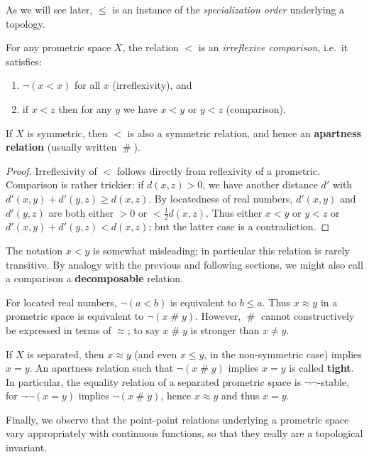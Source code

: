\documentclass{article}
\def\apart{\mathrel{\#}}
\begin{document}
As we will see later, $\le$ is an instance of the \emph{specialization order} underlying a topology.

\begin{thm}
  For any prometric space $X$, the relation $<$ is an \emph{irreflexive comparison}, i.e.\ it satisfies:
  \begin{enumerate}
  \item $\neg(x<x)$ for all $x$ (irreflexivity), and
  \item if $x<z$ then for any $y$ we have $x<y$ or $y<z$ (comparison).
  \end{enumerate}
  If $X$ is symmetric, then $<$ is also a symmetric relation, and hence an \textbf{apartness relation} (usually written $\apart$).
\end{thm}
\begin{proof}
  Irreflexivity of $<$ follows directly from reflexivity of a prometric.
  Comparison is rather trickier: if $d(x,z)>0$, we have another distance $d'$ with $d'(x,y)+d'(y,z)\ge d(x,z)$.
  By locatedness of real numbers, $d'(x,y)$ and $d'(y,z)$ are both either $>0$ or $<\frac12 d(x,z)$.
  Thus either $x<y$ or $y<z$ or $d'(x,y)+d'(y,z) < d(x,z)$; but the latter case is a contradiction.
\end{proof}

The notation $x<y$ is somewhat misleading; in particular this relation is rarely transitive.
By analogy with the previous and following sections, we might also call a comparison a 
\textbf{decomposable} relation.

For located real numbers, $\neg(a<b)$ is equivalent to $b\le a$.
Thus $x\approx y$ in a prometric space is equivalent to $\neg(x\apart y)$.
However, $\apart$ cannot constructively be expressed in terms of $\approx$; to say $x\apart y$ is stronger than $x\neq y$.

If $X$ is separated, then $x\approx y$ (and even $x\le y$, in the non-symmetric case) implies $x=y$.
An apartness relation such that $\neg(x\apart y)$ implies $x=y$ is called \textbf{tight}.
In particular, the equality relation of a separated prometric space is $\neg\neg$-stable, for $\neg\neg(x=y)$ implies $\neg(x\apart y)$, hence $x\approx y$ and thus $x=y$.

Finally, we observe that the point-point relations underlying a prometric space vary appropriately with continuous functions, so that they really are a topological invariant.
\end{document}
